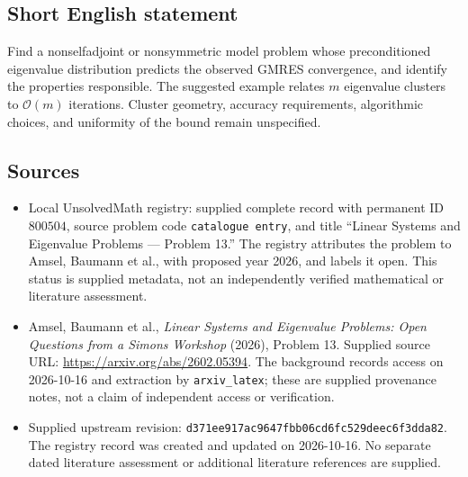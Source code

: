 \documentclass[11pt]{article}
\begin{document}
\subsection{Short English statement}
Find a nonselfadjoint or nonsymmetric model problem whose preconditioned eigenvalue distribution predicts the observed GMRES convergence, and identify the properties responsible. The suggested example relates \(m\) eigenvalue clusters to \(\mathcal O(m)\) iterations. Cluster geometry, accuracy requirements, algorithmic choices, and uniformity of the bound remain unspecified.
\subsection{Sources}
\begin{itemize}
\item Local UnsolvedMath registry: supplied complete record with permanent ID \(800504\), source problem code \texttt{catalogue entry}, and title ``Linear Systems and Eigenvalue Problems --- Problem 13.'' The registry attributes the problem to Amsel, Baumann et al., with proposed year 2026, and labels it open. This status is supplied metadata, not an independently verified mathematical or literature assessment.
\item Amsel, Baumann et al., \emph{Linear Systems and Eigenvalue Problems: Open Questions from a Simons Workshop} (2026), Problem 13. Supplied source URL: \url{https://arxiv.org/abs/2602.05394}. The background records access on 2026-10-16 and extraction by \texttt{arxiv\_latex}; these are supplied provenance notes, not a claim of independent access or verification.
\item Supplied upstream revision: \texttt{d371ee917ac9647fbb06cd6fc529deec6f3dda82}. The registry record was created and updated on 2026-10-16. No separate dated literature assessment or additional literature references are supplied.
\end{itemize}
\end{document}

